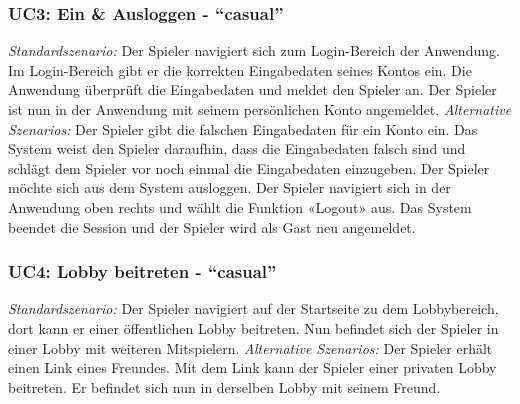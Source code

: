 \documentclass[11pt,ngerman]{article}
\newcommand{\quotes}[1]{``#1''}
\begin{document}
        \subsubsection{UC3: Ein \& Ausloggen  - \quotes{casual}}
        \label{sssec:UC3EinAusloggen}
        \begin{tcolorbox}[enhanced, breakable, sharp corners, width=\dimexpr\textwidth-15mm\relax ,enlarge left by=10mm ,fontupper=\linespread{1.1}\selectfont, boxrule=1pt, title={UC3: Ein \& Ausloggen }, colback=white, colframe=gray!22, coltitle=black]
        	\textit{Standardszenario:} Der Spieler navigiert sich zum Login-Bereich der Anwendung. Im Login-Bereich gibt er die korrekten Eingabedaten seines Kontos ein. Die Anwendung überprüft die Eingabedaten und meldet den Spieler an. Der
        	Spieler ist nun in der Anwendung mit seinem persönlichen Konto angemeldet.\newline
        	\newline
        	\textit{Alternative Szenarios:} \newline
        	Der Spieler gibt die falschen Eingabedaten für ein Konto ein. Das System weist den Spieler
        	daraufhin, dass die Eingabedaten falsch sind und schlägt dem Spieler vor noch einmal die  Eingabedaten einzugeben. \newline
        	\newline
        	Der Spieler möchte sich aus dem System ausloggen. Der Spieler navigiert sich in der Anwendung oben rechts und wählt die Funktion «Logout» aus. Das System beendet die Session und der Spieler wird als Gast neu angemeldet.
        \end{tcolorbox}

        \subsubsection{UC4: Lobby beitreten - \quotes{casual}}
        \label{sssec:UC4Lobbybeitreten}
        \begin{tcolorbox}[enhanced, breakable, sharp corners, width=\dimexpr\textwidth-15mm\relax ,enlarge left by=10mm ,fontupper=\linespread{1.1}\selectfont, boxrule=1pt, title={UC4: Lobby beitreten }, colback=white, colframe=gray!22, coltitle=black]
        	\textit{Standardszenario:} Der Spieler navigiert auf der Startseite zu dem Lobbybereich, dort kann er einer öffentlichen Lobby beitreten. \newline
        	Nun befindet sich der Spieler in einer Lobby mit weiteren Mitspielern.\newline
        	\newline
        	\textit{Alternative Szenarios:} \newline
        	Der Spieler erhält einen Link eines Freundes. Mit dem Link kann der Spieler einer privaten Lobby beitreten. \newline
        	Er befindet sich nun in derselben Lobby mit seinem Freund.
        \end{tcolorbox}
\end{document}
